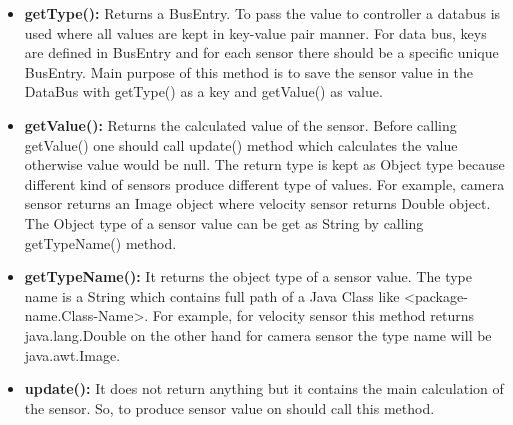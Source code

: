\documentclass[]{article}
\begin{document}
\begin{itemize}
	\item \textbf{getType():} Returns a BusEntry. To pass the value to controller a databus is used where all values are kept in key-value pair manner. For data bus, keys are defined in BusEntry and for each sensor there should be a specific unique BusEntry. Main purpose of this method is to save the sensor value in the DataBus with getType() as a key and getValue() as value.  \\
	
	\item \textbf{getValue():} Returns the calculated value of the sensor. Before calling getValue() one should call update() method which calculates the value otherwise value would be null. The return type is kept as Object type because different kind of sensors produce different type of values. For example, camera sensor returns an Image object where velocity sensor returns Double object. The Object type of a sensor value can be get as String by calling getTypeName() method. \\
	
	\item \textbf{getTypeName():} It returns the object type of a sensor value. The type name is a String which contains full path of a Java Class like <package-name.Class-Name>. For example, for velocity sensor this method returns java.lang.Double on the other hand for camera sensor the type name will be java.awt.Image. \\
	
	\item \textbf{update():} It does not return anything but it contains the main calculation of the sensor. So, to produce sensor value on should call this method. \\
	
\end{itemize}
\end{document}

